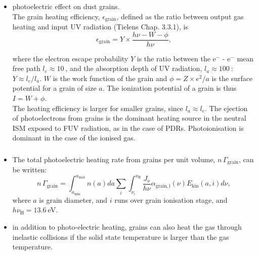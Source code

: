 \begin{frame}
\begin{itemize}
\end{itemize}

\end{frame} \begin{frame}\frametitle{}

\begin{itemize}
\item photoelectric effect on dust grains. \\
The grain heating efficiency, $\epsilon_\mathrm{grain}$, defined as the
ratio between output gas heating and input UV radiation (Tielens
Chap. 3.3.1), is 
\[ \epsilon_\mathrm{grain} =  Y \times \frac{h\nu - W - \phi }{h\nu}
,\]

where the electron escape probability $Y$ is the ratio between the
e$^-$ - e$^-$ mean free path $l_e \approx 10~$\angstrom, and the
absorption depth of UV radiation, $l_a \approx 100~$\angstrom :
$Y \approx l_e /l_a$.  $W$ is the work function of the grain and $\phi
= Z \times e^2 / a$ is the surface potential for a grain of size
$a$. The ionization potential of a grain is thus $ I = W + \phi$. \\
The heating efficiency is larger for smaller grains, since
$l_a \approx l_e$.  {\large The ejection of photoelectrons from grains
is the dominant heating source in the neutral ISM exposed to FUV
radiation, as in the case of PDRs. Photoionisation is dominant in the
case of the ionised gas.}
\end{itemize}


\end{frame} \begin{frame}\frametitle{}
\begin{itemize}
\item The total photoelectric  heating  rate from grains per unit volume, $n\,\Gamma_\mathrm{grain}$, can be written:
\[ n\,\Gamma_\mathrm{grain} = \int_{a_\mathrm{min}}^{a_\mathrm{max}}
n(a) da \sum_i \int_{\nu_i}^{\nu_\mathrm{H}} \frac{J_\nu}{h\nu}
\alpha_\mathrm{grain,i}(\nu) E_\mathrm{kin}(a,i) d\nu   , \]
where $a$ is grain diameter, and $i$ runs over grain ionisation stage,
and $ h \nu_\mathrm{H} = 13.6~$eV.

\item in addition to photo-electric heating, grains can also heat the
gas through inelastic collisions if the solid state temperature is
larger than the gas temperature. 
\end{itemize}
 

\end{frame} \begin{frame}\frametitle{}



\end{frame}
